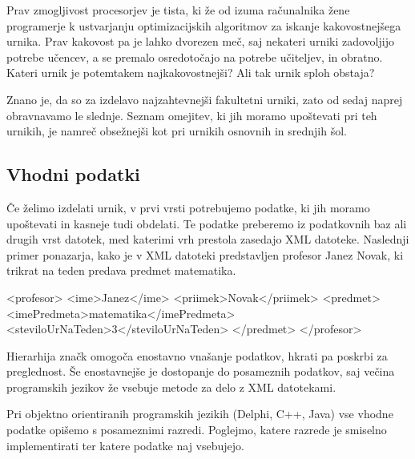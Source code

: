 \documentclass[a4paper,10pt]{article}
\begin{document}
Prav zmogljivost procesorjev je tista, ki že od izuma računalnika žene programerje k
ustvarjanju optimizacijskih algoritmov za iskanje kakovostnejšega urnika. Prav kakovost
pa je lahko dvorezen meč, saj nekateri urniki zadovoljijo potrebe učencev, a se premalo
osredotočajo na potrebe učiteljev, in obratno. Kateri urnik je potemtakem najkakovostnejši?
Ali tak urnik sploh obstaja?

Znano je, da so za izdelavo najzahtevnejši fakultetni urniki, zato od sedaj naprej
obravnavamo le slednje. Seznam omejitev, ki jih moramo upoštevati pri teh urnikih,
je namreč obsežnejši kot pri urnikih osnovnih in srednjih šol.

\subsection{Vhodni podatki}

Če želimo izdelati urnik, v prvi vrsti potrebujemo podatke, ki jih moramo upoštevati in
kasneje tudi obdelati. Te podatke preberemo iz podatkovnih baz ali drugih vrst datotek,
med katerimi vrh prestola zasedajo XML datoteke. Naslednji primer ponazarja, kako je v
XML datoteki predstavljen profesor Janez Novak, ki trikrat na teden predava predmet
matematika.


<profesor>
   <ime>Janez</ime>
   <priimek>Novak</priimek>
   <predmet>
      <imePredmeta>matematika</imePredmeta>
      <steviloUrNaTeden>3</steviloUrNaTeden>
   </predmet>
</profesor>

Hierarhija značk omogoča enostavno vnašanje podatkov, hkrati pa poskrbi za preglednost.
Še enostavnejše je dostopanje do posameznih podatkov, saj večina programskih jezikov že
vsebuje metode za delo z XML datotekami.

Pri objektno orientiranih programskih jezikih (Delphi, C++, Java) vse vhodne podatke
opišemo s posameznimi razredi. Poglejmo, katere razrede je smiselno implementirati ter
katere podatke naj vsebujejo.
\end{document}
